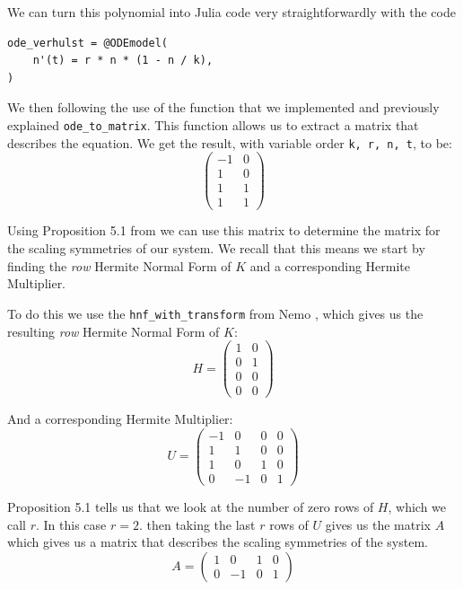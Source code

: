 \documentclass[oneside, a4paper, onecolumn, 11pt]{article}
\begin{document}
We can turn this polynomial into Julia code very straightforwardly with the code
\begin{lstlisting}
ode_verhulst = @ODEmodel(
    n'(t) = r * n * (1 - n / k),
)
\end{lstlisting}

We then following the use of the function that we implemented and previously explained \texttt{ode\_to\_matrix}. This function allows us to extract a matrix that describes the equation. We get the result, with variable order \texttt{k, r, n, t}, to be:
\[
    \begin{pmatrix}
        -1 & 0 \\
        1  & 0 \\
        1  & 1 \\
        1  & 1
    \end{pmatrix}
\]

Using Proposition 5.1 from \cite{Hubert2013} we can use this matrix to determine the matrix for the scaling symmetries of our system. We recall that this means we start by finding the \textit{row} Hermite Normal Form of \(K\) and a corresponding Hermite Multiplier.

To do this we use the \texttt{hnf\_with\_transform} from Nemo \cite{nemo}, which gives us the resulting \textit{row} Hermite Normal Form of \(K\):
\[
    H = \begin{pmatrix}
        1 & 0 \\
        0 & 1 \\
        0 & 0 \\
        0 & 0
    \end{pmatrix}
\]

And a corresponding Hermite Multiplier:
\[
    U = \begin{pmatrix}
        -1 & 0  & 0 & 0 \\
        1  & 1  & 0 & 0 \\
        1  & 0  & 1 & 0 \\
        0  & -1 & 0 & 1
    \end{pmatrix}
\]

Proposition 5.1 tells us that we look at the number of zero rows of \(H\), which we call \(r\). In this case \(r = 2\). then taking the last \(r\) rows of \(U\) gives us the matrix \(A\) which gives us a matrix that describes the scaling symmetries of the system.
\[
    A = \begin{pmatrix}
        1 & 0  & 1 & 0 \\
        0 & -1 & 0 & 1
    \end{pmatrix}
\]
\end{document}
